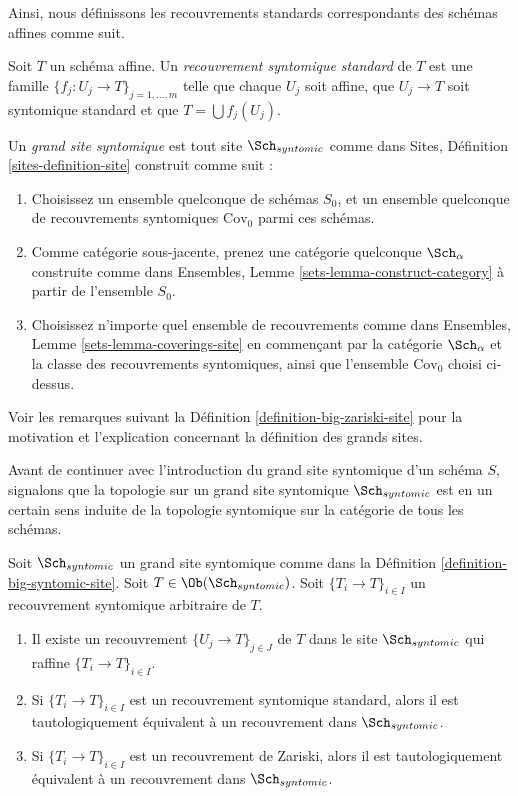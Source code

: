 \noindent
Ainsi, nous définissons les recouvrements standards correspondants des schémas affines comme suit.

\begin{definition}
\label{definition-standard-syntomic}
Soit $T$ un schéma affine. Un {\it recouvrement syntomique standard} de $T$ est une famille $\{f_j : U_j \to T\}_{j = 1, \ldots, m}$ telle que chaque $U_j$ soit affine, que $U_j \to T$ soit syntomique standard et que $T = \bigcup f_j(U_j)$.
\end{definition}

\begin{definition}
\label{definition-big-syntomic-site}
Un {\it grand site syntomique} est tout site $\Sch_{syntomic}$ comme dans Sites, Définition \ref{sites-definition-site} construit comme suit :
\begin{enumerate}
\item Choisissez un ensemble quelconque de schémas $S_0$, et un ensemble quelconque de recouvrements syntomiques $\text{Cov}_0$ parmi ces schémas.
\item Comme catégorie sous-jacente, prenez une catégorie quelconque $\Sch_\alpha$\newline construite comme dans Ensembles, Lemme \ref{sets-lemma-construct-category} à partir de l'ensemble $S_0$.
\item Choisissez n'importe quel ensemble de recouvrements comme dans Ensembles, Lemme \ref{sets-lemma-coverings-site} en commençant par la catégorie $\Sch_\alpha$ et la classe des recouvrements syntomiques, ainsi que l'ensemble $\text{Cov}_0$ choisi ci-dessus.
\end{enumerate}
\end{definition}

\noindent
Voir les remarques suivant la Définition \ref{definition-big-zariski-site} pour la motivation et l'explication concernant la définition des grands sites.

\medskip\noindent
Avant de continuer avec l'introduction du grand site syntomique d'un schéma $S$, signalons que la topologie sur un grand site syntomique $\Sch_{syntomic}$ est en un certain sens induite de la topologie syntomique sur la catégorie de tous les schémas.

\begin{lemma}
\label{lemma-syntomic-induced}
Soit $\Sch_{syntomic}$ un grand site syntomique comme dans la Définition \ref{definition-big-syntomic-site}. Soit $T \in \Ob(\Sch_{syntomic})$. Soit $\{T_i \to T\}_{i \in I}$ un recouvrement syntomique arbitraire de $T$.
\begin{enumerate}
\item Il existe un recouvrement $\{U_j \to T\}_{j \in J}$ de $T$ dans le site $\Sch_{syntomic}$ qui raffine $\{T_i \to T\}_{i \in I}$.
\item Si $\{T_i \to T\}_{i \in I}$ est un recouvrement syntomique standard, alors il est tautologiquement équivalent à un recouvrement dans $\Sch_{syntomic}$.
\item Si $\{T_i \to T\}_{i \in I}$ est un recouvrement de Zariski, alors il est tautologiquement équivalent à un recouvrement dans $\Sch_{syntomic}$.
\end{enumerate}
\end{lemma}

